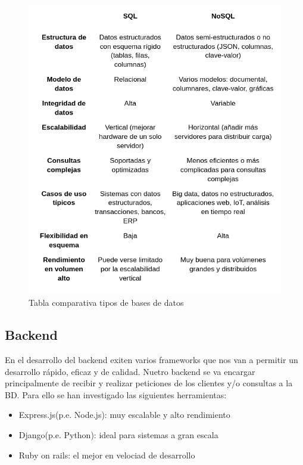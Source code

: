 \begin{figure}[H]
   \centering
    \includegraphics[width=\textwidth]{tablas/BDS.png}
    \caption{Tabla comparativa tipos de bases de datos}
    \label{fig:Tabla BDS}
\end{figure} 

\subsection{Backend}

En el desarrollo del backend exiten varios frameworks que nos van a permitir un desarrollo rápido, eficaz y de calidad. Nuetro backend se va encargar principalmente de recibir y realizar peticiones de los clientes y/o consultas a la BD. Para ello se han investigado las siguientes herramientas:

\begin{itemize}
	\item Express.js(p.e. Node.js): muy escalable y alto rendimiento
	\item Django(p.e. Python): ideal para sistemas a gran escala
	\item Ruby on rails: el mejor en velociad de desarrollo
\end{itemize}

